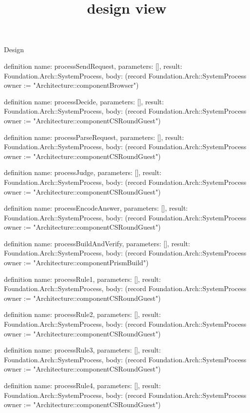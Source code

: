 \begin{lexlean}{Design}
\title{design view}
\begin{semanticmodule}
definition{
  name: processSendRequest,
  parameters: [],
  result: Foundation.Arch::SystemProcess,
  body: (record Foundation.Arch::SystemProcess {owner := "Architecture::componentBrowser"})
}

definition{
  name: processDecide,
  parameters: [],
  result: Foundation.Arch::SystemProcess,
  body: (record Foundation.Arch::SystemProcess {owner := "Architecture::componentCSRoundGuest"})
}

definition{
  name: processParseRequest,
  parameters: [],
  result: Foundation.Arch::SystemProcess,
  body: (record Foundation.Arch::SystemProcess {owner := "Architecture::componentCSRoundGuest"})
}

definition{
  name: processJudge,
  parameters: [],
  result: Foundation.Arch::SystemProcess,
  body: (record Foundation.Arch::SystemProcess {owner := "Architecture::componentCSRoundGuest"})
}

definition{
  name: processEncodeAnswer,
  parameters: [],
  result: Foundation.Arch::SystemProcess,
  body: (record Foundation.Arch::SystemProcess {owner := "Architecture::componentCSRoundGuest"})
}

definition{
  name: processBuildAndVerify,
  parameters: [],
  result: Foundation.Arch::SystemProcess,
  body: (record Foundation.Arch::SystemProcess {owner := "Architecture::componentPrismBuild"})
}

definition{
  name: processRule1,
  parameters: [],
  result: Foundation.Arch::SystemProcess,
  body: (record Foundation.Arch::SystemProcess {owner := "Architecture::componentCSRoundGuest"})
}

definition{
  name: processRule2,
  parameters: [],
  result: Foundation.Arch::SystemProcess,
  body: (record Foundation.Arch::SystemProcess {owner := "Architecture::componentCSRoundGuest"})
}

definition{
  name: processRule3,
  parameters: [],
  result: Foundation.Arch::SystemProcess,
  body: (record Foundation.Arch::SystemProcess {owner := "Architecture::componentCSRoundGuest"})
}

definition{
  name: processRule4,
  parameters: [],
  result: Foundation.Arch::SystemProcess,
  body: (record Foundation.Arch::SystemProcess {owner := "Architecture::componentCSRoundGuest"})
}


\end{semanticmodule}
\end{lexlean}
